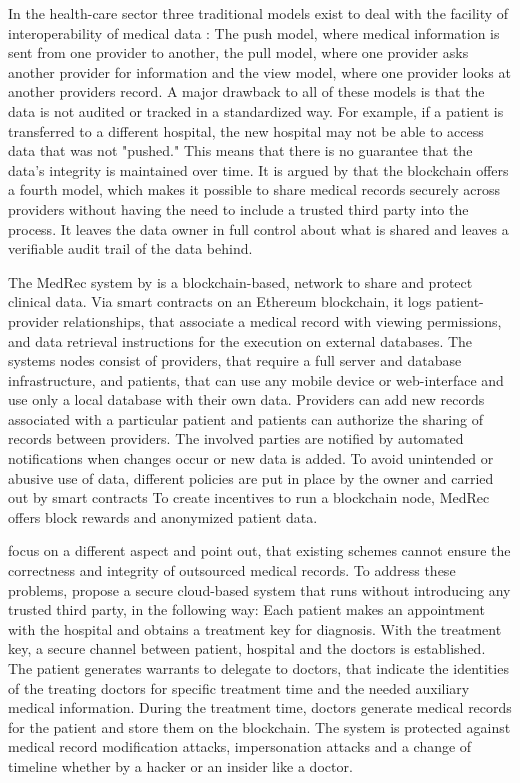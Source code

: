 In the health-care sector three traditional models exist to deal with the facility of interoperability of medical data \cite{Kshetri2017}: The push model, where medical information is sent from one provider to another, the pull model, where one provider asks another provider for information and the view model, where one provider looks at another providers record.
A major drawback to all of these models is that the data is not audited or tracked in a standardized way. For example, if a patient is transferred to a different hospital, the new hospital may not be able to access data that was not "pushed." This means that there is no guarantee that the data's integrity is maintained over time.
It is argued by \citeauthor{Kshetri2017} that the blockchain offers a fourth model, which makes it possible to share medical records securely across providers without having the need to include a trusted third party into the process. It leaves the data owner in full control about what is shared and leaves a verifiable audit trail of the data behind. \cite{Kshetri2017}

The MedRec system by \citeauthor{Azaria2016} is a blockchain-based, network to share and protect clinical data. Via smart contracts on an Ethereum blockchain, it logs patient-provider relationships, that associate a medical record with viewing permissions, and data retrieval instructions for the execution on external databases.
The systems nodes consist of providers, that require a full server and database infrastructure, and patients, that can use any mobile device or web-interface and use only a local database with their own data.
Providers can add new records associated with a particular patient and patients can authorize the sharing of records between providers. The involved parties are notified by automated notifications when changes occur or new data is added. To avoid unintended or abusive use of data, different policies are put in place by the owner and carried out by smart contracts
To create incentives to run a blockchain node, MedRec offers block rewards and anonymized patient data.

\citeauthor{Cao2019} focus on a different aspect and point out, that existing schemes cannot ensure the correctness and integrity of outsourced medical records. 
To address these problems, \citeauthor{Cao2019} propose a secure cloud-based system that runs without introducing any trusted third party, in the following way:
 Each patient makes an appointment with the hospital and obtains a treatment key for diagnosis. With the treatment key, a secure channel between patient, hospital and the doctors is established. 
The patient generates warrants to delegate to doctors, that indicate the identities of the treating doctors for specific treatment time and the needed auxiliary medical information.\cite{Cao2019}
During the treatment time, doctors generate medical records for the patient and store them on the blockchain.\cite{Cao2019}
The system is protected against medical record modification attacks, impersonation attacks and a change of timeline whether by a hacker or an insider like a doctor.

